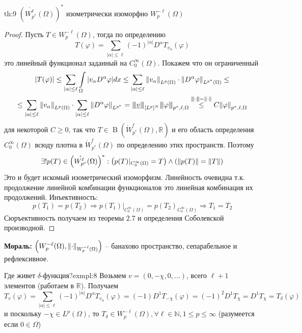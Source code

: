 \documentclass[12pt,a4paper]{article}
\newcommand{\intset}[1]{\int\limits_{#1}}
\newcommand{\Real}{\mathbb{R}}
\newcommand{\Natural}{\mathbb{N}}
\newcommand{\nnorm}[1]{{\left\vert\kern-0.25ex\left\vert\kern-0.25ex\left\vert #1 
		\right\vert\kern-0.25ex\right\vert\kern-0.25ex\right\vert}}
\DeclareMathOperator{\bounded}{B}
\begin{document}
\begin{theorem}{}{th:9}
	$\left(\mathring{W_{p^*}^\ell} (\Omega)\right)^*$ изометрически изоморфно $W_p^{-\ell} (\Omega)$
\end{theorem}
\begin{proof}
	Пусть $T \in W_p^{-\ell} (\Omega)$, тогда по определению
	\begin{equation*}
		T (\varphi) = \sum\limits_{|\alpha| \leq \ell}{(-1)^{|\alpha|} D^\alpha T_{v_\alpha} (\varphi)}
	\end{equation*}
	это линейный функционал заданный на $C_0^\infty (\Omega)$. Покажем что он ограниченный
	\begin{multline*}
		|T(\varphi)| \leq \sum\limits_{|\alpha| \leq \ell}{\intset{\Omega}{|v_\alpha D^\alpha \varphi| dx}} \leq \sum\limits_{|\alpha| \leq \ell}{\norm{v_\alpha}_{L^p (\Omega)} \cdot \norm{D^\alpha \varphi}_{L^{p^*} (\Omega)}} \leq \\ \leq \sum\limits_{|\alpha| \leq \ell}{\norm{v_\alpha}_{L^p (\Omega)}} \cdot \sum\limits_{|\alpha| \leq \ell}{\norm{D^\alpha \varphi}_{L^{p^*}}} = \nnorm{\underline{v}}_{[L^p]^N} \nnorm{\varphi}_{p^*, \ell, \Omega} \overset{\nnorm{\cdot} \sim \norm{\cdot}}{\leq} C \norm{\varphi}_{p^*, \ell, \Omega}
	\end{multline*}
	для некоторой $C \geq 0$, так что $T \in \bounded(\mathring{W}_{p^*}^\ell (\Omega), \Real)$ и его область определения $C_0^\infty(\Omega)$ всюду плотна в $\mathring{W}_{p^*}^\ell (\Omega)$ по определению этих пространств. Поэтому 
	\begin{equation*}
		\exists!{p (T)} \in \left(\mathring{W_{p^*}^\ell} (\Omega)\right)^*: \left( p(T) |_{C_0^\infty (\Omega)} = T \right) \wedge \left( \norm{p (T)} = \norm{T} \right)
	\end{equation*}
	Это и будет искомый изометрический изоморфизм. Линейность очевидна т.к. продолжение линейной комбинации функционалов это линейная комбинация их продолжений. Инъективность:
	\begin{equation*}
		p(T_1) = p(T_2) \Rightarrow p(T_1) |_{C_0^\infty (\Omega)} = p(T_2)_{C_0^\infty (\Omega)} \Rightarrow T_1 = T_2
	\end{equation*} 
	Сюръективность получаем из теоремы 2.7 и определения Соболевской производной. 
\end{proof}
\textbf{Мораль:} $\left( W_p^{-\ell} (\Omega), \norm{\cdot}_{W_p^{-\ell} (\Omega)} \right)$ -- банахово пространство, сепарабельное и рефлексивное. 

\begin{example}{Где живет $\delta$-функция?}{exmpl:8}
	Возьмем $v = (0, -\chi, 0, ...)$, всего $\ell + 1$ элементов (работаем в $\Real$). Получаем 
	\begin{equation*}
		T_v (\varphi) = \sum\limits_{|\alpha| \leq \ell}{(-1)^{|\alpha|} D^\alpha T_{v_\alpha}(\varphi)} = (-1)D^1 T_{-\chi} (\varphi) = (-1)^2 D^1 T_{\chi} = D^1 T_{\chi} = T_\delta (\varphi)
	\end{equation*}
	и поскольку $-\chi \in L^p (\Omega)$, то $T_\delta \in W_p^{-\ell} (\Omega), \forall \ell \in \Natural, 1 \leq p \leq \infty$ (разумеется если $0 \in \Omega$)
\end{example}

\newpage

\end{document}
